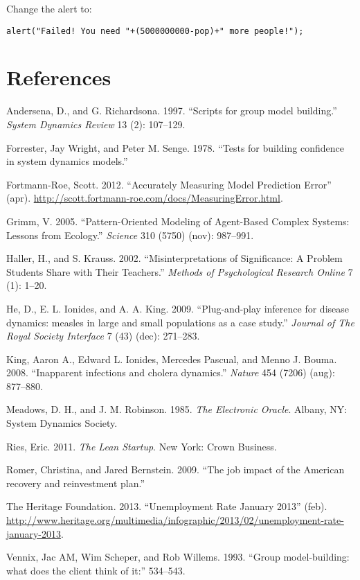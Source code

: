 \documentclass[]{memoir}
\begin{document}

Change the alert to:

\begin{lstlisting}
alert("Failed! You need "+(5000000000-pop)+" more people!");
\end{lstlisting}

\chapter{References}

Andersena, D., and G. Richardsona. 1997. ``Scripts for group model
building.'' \emph{System Dynamics Review} 13 (2): 107--129.

Forrester, Jay Wright, and Peter M. Senge. 1978. ``Tests for building
confidence in system dynamics models.''

Fortmann-Roe, Scott. 2012. ``Accurately Measuring Model Prediction
Error'' (apr).
\url{http://scott.fortmann-roe.com/docs/MeasuringError.html}.

Grimm, V. 2005. ``Pattern-Oriented Modeling of Agent-Based Complex
Systems: Lessons from Ecology.'' \emph{Science} 310 (5750) (nov):
987--991.

Haller, H., and S. Krauss. 2002. ``Misinterpretations of Significance: A
Problem Students Share with Their Teachers.'' \emph{Methods of
Psychological Research Online} 7 (1): 1--20.

He, D., E. L. Ionides, and A. A. King. 2009. ``Plug-and-play inference
for disease dynamics: measles in large and small populations as a case
study.'' \emph{Journal of The Royal Society Interface} 7 (43) (dec):
271--283.

King, Aaron A., Edward L. Ionides, Mercedes Pascual, and Menno J. Bouma.
2008. ``Inapparent infections and cholera dynamics.'' \emph{Nature} 454
(7206) (aug): 877--880.

Meadows, D. H., and J. M. Robinson. 1985. \emph{The Electronic Oracle}.
Albany, NY: System Dynamics Society.

Ries, Eric. 2011. \emph{The Lean Startup}. New York: Crown Business.

Romer, Christina, and Jared Bernstein. 2009. ``The job impact of the
American recovery and reinvestment plan.''

The Heritage Foundation. 2013. ``Unemployment Rate January 2013'' (feb).
\url{http://www.heritage.org/multimedia/infographic/2013/02/unemployment-rate-january-2013}.

Vennix, Jac AM, Wim Scheper, and Rob Willems. 1993. ``Group
model-building: what does the client think of it:'' 534--543.
\end{document}
